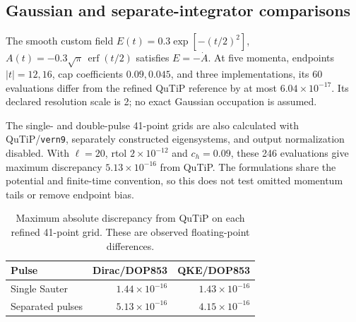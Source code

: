 \documentclass[11pt,a4paper]{article}
\begin{document}
\subsection{Gaussian and separate-integrator comparisons}
\label{sec:profiles}
\label{sec:separate-results}
The smooth custom field $E(t)=0.3\exp[-(t/2)^2]$, $A(t)=-0.3\sqrt{\pi}\,\operatorname{erf}(t/2)$ satisfies $E=-\dot A$. At five momenta, endpoints $|t|=12,16$, cap coefficients $0.09,0.045$, and three implementations, its 60 evaluations differ from the refined QuTiP reference by at most $6.04\times10^{-17}$. Its declared resolution scale is 2; no exact Gaussian occupation is assumed.

The single- and double-pulse 41-point grids are also calculated with QuTiP/\texttt{vern9}, separately constructed eigensystems, and output normalization disabled. With $\ell=20$, rtol $2\times10^{-12}$ and $c_h=0.09$, these 246 evaluations give maximum discrepancy $5.13\times10^{-16}$ from QuTiP. The formulations share the potential and finite-time convention, so this does not test omitted momentum tails or remove endpoint bias.
\begin{table}[htbp]\centering\small
\caption{Maximum absolute discrepancy from QuTiP on each refined 41-point grid. These are observed floating-point differences.}\label{tab:separate}
\begin{tabular}{lrr}\toprule
Pulse & Dirac/DOP853 & QKE/DOP853\\\midrule
Single Sauter & $1.44\times10^{-16}$ & $1.43\times10^{-16}$\\
Separated pulses & $5.13\times10^{-16}$ & $4.15\times10^{-16}$\\
\bottomrule\end{tabular}\end{table}
\end{document}
